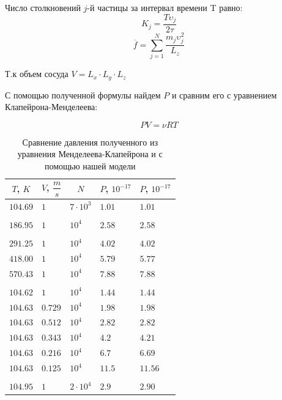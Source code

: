 \documentclass[twoside,twocolumn, 11pt]{article}
\theoremstyle{plain}
\theoremstyle{definition}
\begin{document}
Число столкновений $j$-й частицы за интервал времени T равно:
\[K_j = \dfrac{T \upsilon_j }{2\tau} \]
\[\overline{f} = \sum_{j = 1}^N \dfrac{m_j \upsilon_j^2}{L_z}\]

Т.к объем сосуда $V = L_x \cdot L_y \cdot L_z$

\begin{center}
\end{center}

\indent С помощью полученной формулы найдем $P$ и сравним его с уравнением Клапейрона-Менделеева:

\[PV = \nu R T \]

\begin{table}[h!]
\centering
\label{Table 1}
\begin{tabular}{|l|l|l|l|l|}
\hline
\multicolumn{1}{|c|}{$T$, $K$} & \multicolumn{1}{c|}{$V$, $\dfrac{m}{s}$} & \multicolumn{1}{c|}{$N$} & \multicolumn{1}{c|}{$P$, $10^{-17}$} & \multicolumn{1}{c|}{$P$, $10^{-17}$} \\ \hline
$104.69$ & $1$ & $7\cdot 10^3$ & $1.01$ & $1.01$                                    \\
& & & &                                         \\
$186.95$ & $1$ & $10^4$ & $2.58$ & $2.58$                                    \\
& & & &                                         \\
$291.25$ & $1$ & $10^4$ & $4.02$ & $4.02$                                    \\
$418.00$ & $1$ & $10^4$ & $5.79$ & $5.77$                                    \\
$570.43$ & $1$ & $10^4$ & $7.88$ & $7.88$                                    \\
& & & &                                         \\
$104.62$ & $1$ & $10^4$ & $1.44$ & $1.44$                                  \\
$104.63$ & $0.729$ & $10^4$ & $1.98$ & $1.98$                                    \\
$104.63$ & $0.512$ & $10^4$ & $2.82$ & $2.82$                                    \\
$104.63$ & $0.343$ & $10^4$ & $4.2$ & $4.21$                                    \\
$104.63$ & $0.216$ & $10^4$ & $6.7$ & $6.69$                                    \\
$104.63$ & $0.125$ & $10^4$ & $11.5$ & $11.56$                                   \\
& & & &                                         \\
$104.95$ & $1$ & $2 \cdot 10^4$ & $2.9$ & $2.90$                                    \\ \hline
\end{tabular}
\caption{Сравнение давления полученного из уравнения Менделеева-Клапейрона и с помощью нашей модели}
\end{table}
\end{document}
